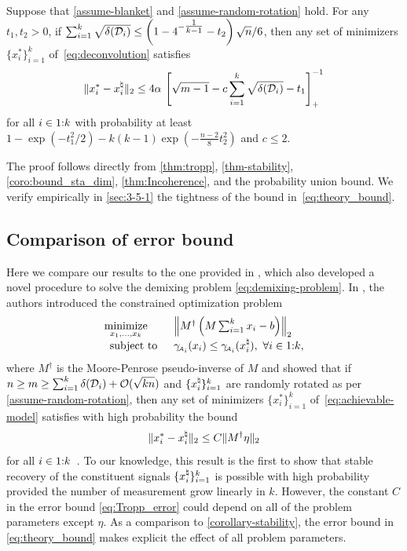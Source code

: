 \begin{theorem} \label{corollary-stability}
    Suppose that \autoref{assume-blanket} and \autoref{assume-random-rotation} hold. For any $t_1, t_2 > 0$, if $\sum_{i=1}^k \sqrt{\delta(\mathcal{D}_i)} \leq \left(1 - 4^{- \tfrac{1}{k-1} } - t_2\right)\sqrt{n} / 6$, then any set of minimizers $\{x_i^*\}_{i=1}^k$ of~\eqref{eq:deconvolution} satisfies 
  \begin{equation} \label{eq:theory_bound}
    \|x_i^* - x_i^{\natural}\|_2 
     \leq
     4\alpha\,\left[\sqrt{m-1} - c\sum_{i=1}^k \sqrt{\delta(\mathcal{D}_i)} - t_1\right]_+^{-1}
  \end{equation}
   for all $i\in1\mathord{:}k$ with probability at least $1 - \exp\left(-t_1^2/2\right) - k(k-1)\exp(-\tfrac{n-2}{8}t_2^2)$ and $c\leq2$.
\end{theorem}
The proof follows directly from \autoref{thm:tropp}, \autoref{thm-stability}, \autoref{coro:bound_sta_dim}, \autoref{thm:Incoherence}, and the probability union bound. We verify empirically in \autoref{sec:3-5-1} the tightness of the bound in~\eqref{eq:theory_bound}.

\subsection{Comparison of error bound} \label{sec:comparasion}

Here we compare our results to the one provided in \citep{mccoy2013achievable}, which also developed a novel procedure to solve the demixing problem \eqref{eq:demixing-problem}. In \citep{mccoy2013achievable}, the authors introduced the constrained optimization problem
\begin{equation}
    \label{eq:achievable-model}
    \begin{array}{ll}
    \displaystyle\mathop{\hbox{\rm minimize}}_{x_1,\ldots,x_k}\enspace
    & \left\|
      M^\dagger\left(M\sum_{i=1}^k x_i - b\right)
    \right\|_2 \\
   \enspace\mathop{\hbox{\rm subject to}}\enspace
    & \gamma_{\!\scriptscriptstyle\mathcal{A}_i}(x_i) \le \gamma_{\!\scriptscriptstyle\mathcal{A}_i}(x_i^{\natural}), \ \forall i\in1\mathord{:}k,
    \end{array}
\end{equation}
where $M^\dagger$ is the Moore-Penrose pseudo-inverse of $M$ and showed that if \(n\ge m\ge \sum_{i=1}^k\delta(\mathcal{D}_i)+\mathcal{O}(\sqrt{kn})\) and $\{x_i^{\natural}\}_{i=1}^k$ are randomly rotated as per \autoref{assume-random-rotation}, then any set of minimizers $\{x_i^*\}_{i=1}^k$ of~\eqref{eq:achievable-model} satisfies with high probability the bound
\begin{equation}\label{eq:Tropp_error}
    \|x_i^*-x_i^{\natural}\|_2\le C\|M^\dagger\eta\|_2
\end{equation}
for all $i\in1\mathord{:}k$~\cite[Theorem~A]{mccoy2013achievable}. To our knowledge, this result is the first to show that stable recovery of the constituent signals $\{x_i^{\natural}\}_{i=1}^k$ is possible with high probability provided the number of measurement grow linearly in $k$. However, the constant $C$ in the error bound \eqref{eq:Tropp_error} could depend on all of the problem parameters except $\eta$. As a comparison to \autoref{corollary-stability}, the error bound in \eqref{eq:theory_bound} makes explicit the effect of all problem parameters.

